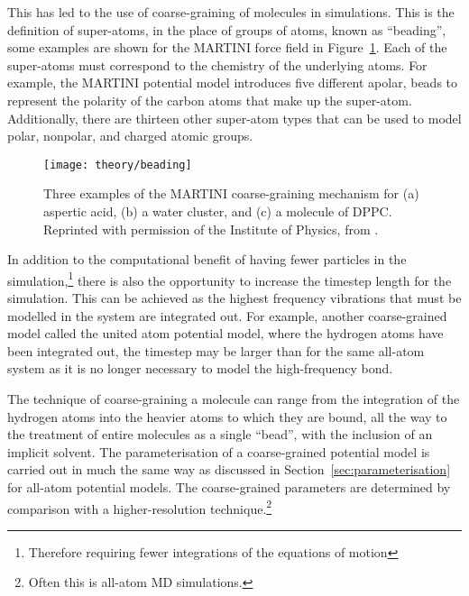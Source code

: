 This has led to the use of coarse-graining of molecules in simulations.
This is the definition of super-atoms, in the place of groups of atoms, known as ``beading'', some examples are shown for the MARTINI force field\autocite{marrink_martini_2007} in Figure~\ref{fig:cg}.
Each of the super-atoms must correspond to the chemistry of the underlying atoms.
For example, the MARTINI potential model introduces five different apolar, beads to represent the polarity of the carbon atoms that make up the super-atom.
Additionally, there are thirteen other super-atom types that can be used to model polar, nonpolar, and charged atomic groups.
%
\begin{figure}[t]
    \forcerectofloat
    \centering
    \texttt{[image: theory/beading]}
    \caption{Three examples of the MARTINI coarse-graining mechanism for (a) aspertic acid, (b) a water cluster, and (c) a molecule of DPPC. Reprinted with permission of the Institute of Physics, from \cite{pluhackova_biomembranes_2015}.}
    \label{fig:cg}
\end{figure}
%

In addition to the computational benefit of having fewer particles in the simulation,\footnote{Therefore requiring fewer integrations of the equations of motion} there is also the opportunity to increase the timestep length for the simulation.\autocite{pluhackova_biomembranes_2015}
This can be achieved as the highest frequency vibrations that must be modelled in the system are integrated out.
For example, another coarse-grained model called the united atom potential model, where the hydrogen atoms have been integrated out, the timestep may be larger than for the same all-atom system as it is no longer necessary to model the high-frequency  bond.

The technique of coarse-graining a molecule can range from the integration of the hydrogen atoms into the heavier atoms to which they are bound, all the way to the treatment of entire molecules as a single ``bead'', with the inclusion of an implicit solvent.
The parameterisation of a coarse-grained potential model is carried out in much the same way as discussed in Section~\ref{sec:parameterisation} for all-atom potential models.
The coarse-grained parameters are determined by comparison with a higher-resolution technique.\footnote{Often this is all-atom MD simulations.}
